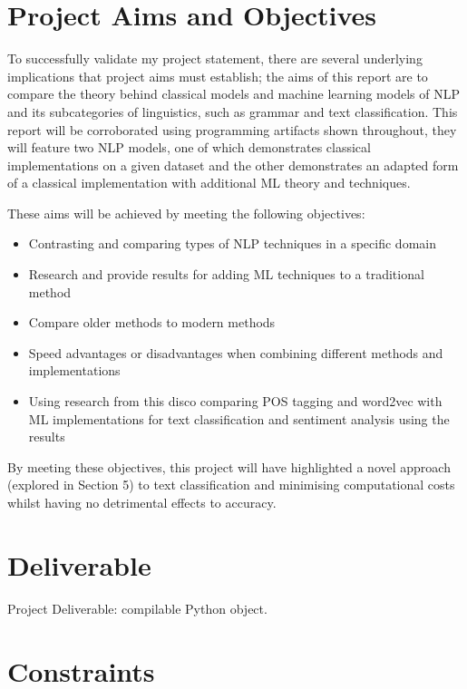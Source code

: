 \section{Project Aims and Objectives}

To successfully validate my project statement, there are several underlying implications that project aims must establish; the aims of this report are to compare the theory behind classical models and machine learning models of NLP and its subcategories of linguistics, such as grammar and text classification. This report will be corroborated using programming artifacts shown throughout, they will feature two NLP models, one of which demonstrates classical implementations on a given dataset and the other demonstrates an adapted form of a classical implementation with additional ML theory and techniques.

These aims will be achieved by meeting the following objectives:

\begin{itemize}
    \item Contrasting and comparing types of NLP techniques in a specific domain
    \item Research and provide results for adding ML techniques to a traditional method
	\item Compare older methods to modern methods
	\item Speed advantages or disadvantages when combining different methods and implementations
	\item Using research from this disco comparing POS tagging and word2vec with ML implementations for text classification and sentiment analysis using the results
\end{itemize}

By meeting these objectives, this project will have highlighted a novel approach (explored in Section 5) to text classification and minimising computational costs whilst having no detrimental effects to accuracy.

\section{Deliverable}

Project Deliverable: compilable Python object.

\section{Constraints}

